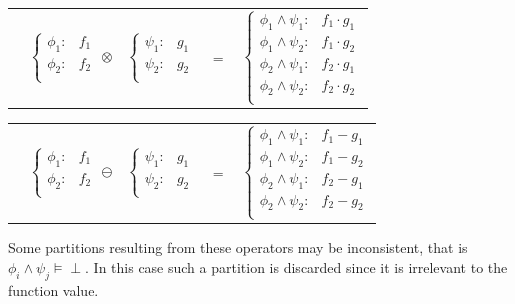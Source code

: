 \documentclass[twoside,11pt]{article}
\begin{document}
{\begin{center}
\hspace{-2mm}
\begin{tabular}{r c c c l}
&
\hspace{-6mm} 
  $\begin{cases}
    \phi_1: & f_1 \\ 
    \phi_2: & f_2 \\ 
  \end{cases}$
$\otimes$
&
\hspace{-4mm}
  $\begin{cases}
    \psi_1: & g_1 \\ 
    \psi_2: & g_2 \\ 
  \end{cases}$
&
\hspace{-2mm} 
$ = $
&
\hspace{-2mm}
  $\begin{cases}
  \phi_1 \wedge \psi_1: & f_1 \cdot g_1 \\ 
  \phi_1 \wedge \psi_2: & f_1 \cdot g_2 \\ 
  \phi_2 \wedge \psi_1: & f_2 \cdot g_1 \\ 
  \phi_2 \wedge \psi_2: & f_2 \cdot g_2 \\ 
  \end{cases}$
\end{tabular}
\vspace{4mm}
\hspace{-2mm}

\hspace{-2mm}
\begin{tabular}{r c c c l}
&
\hspace{-6mm} 
  $\begin{cases}
    \phi_1: & f_1 \\ 
    \phi_2: & f_2 \\ 
  \end{cases}$
$\ominus$
&
\hspace{-4mm}
  $\begin{cases}
    \psi_1: & g_1 \\ 
    \psi_2: & g_2 \\ 
  \end{cases}$
&
\hspace{-2mm} 
$ = $
&
\hspace{-2mm}
  $\begin{cases}
  \phi_1 \wedge \psi_1: & f_1 - g_1 \\ 
  \phi_1 \wedge \psi_2: & f_1 - g_2 \\ 
  \phi_2 \wedge \psi_1: & f_2 - g_1 \\ 
  \phi_2 \wedge \psi_2: & f_2 - g_2 \\ 
  \end{cases}$
\end{tabular}
\vspace{4mm}
\hspace{-2mm}
\end{center}
}
Some partitions resulting from
these operators may be inconsistent, that is $\phi_i \wedge \psi_j \models \perp$. In this case such a partition is discarded since it is irrelevant to the function value.
\end{document}

